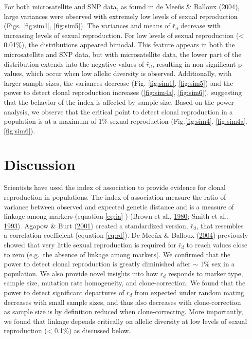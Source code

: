 \documentclass[double,11pt]{beavtex}
\begin{document}
  For both microsatellite and SNP data, as found in de Meeûs \& Balloux
  (\protect\hyperlink{ref-de2004clonal}{2004}), large variances were
  observed with extremely low levels of sexual reproduction (Figs.
  \ref{fig:sim1}, \ref{fig:sim5}). The variances and means of
  \(\bar{r}_d\) decrease with increasing levels of sexual reproduction.
  For low levels of sexual reproduction (\textless{} 0.01\%), the
  distributions appeared bimodal. This feature appears in both the
  microsatellite and SNP data, but with microsatellite data, the lower
  part of the distribution extends into the negative values of
  \(\bar{r}_d\), resulting in non-significant p-values, which occur when
  low allelic diversity is observed. Additionally, with larger sample
  sizes, the variances decrease (Fig. \ref{fig:sim1}, \ref{fig:sim5}) and
  the power to detect clonal reproduction increases (\ref{fig:sim4a},
  \ref{fig:sim6}), suggesting that the behavior of the index is affected
  by sample size. Based on the power analysis, we observe that the
  critical point to detect clonal reproduction in a population is at a
  maximum of 1\% sexual reproduction (Fig.\ref{fig:sim4}, \ref{fig:sim4a},
  \ref{fig:sim6}).
  
  \section{Discussion}\label{discussion-2}
  
  Scientists have used the index of association to provide evidence for
  clonal reproduction in populations. The index of association measure the
  ratio of variance between observed and expected genetic distance and is
  a measure of linkage among markers (equation \eqref{eq:ia} ) (Brown et
  al., \protect\hyperlink{ref-brown1980multilocus}{1980}; Smith et al.,
  \protect\hyperlink{ref-smith1993how}{1993}). Agapow \& Burt
  (\protect\hyperlink{ref-Agapow_2001}{2001}) created a standardized
  version, \(\bar{r}_d\), that resembles a correlation coefficient
  (equation \eqref{eq:rd}). De Meeûx \& Balloux
  (\protect\hyperlink{ref-de2004clonal}{2004}) previously showed that very
  little sexual reproduction is required for \(\bar{r}_d\) to reach values
  close to zero (e.g.~the absence of linkage among markers). We confirmed
  that the power to detect clonal reproduction is greatly diminished after
  \(\sim\) 1\% sex in a population. We also provide novel insights into
  how \(\bar{r}_d\) responds to marker type, sample size, mutation rate
  homogeneity, and clone-correction. We found that the power to detect
  significant departures of \(\bar{r}_d\) from expected under random
  mating decreases with small sample sizes, and thus also decreases with
  clone-correction as sample size is by definition reduced when
  clone-correcting. More importantly, we found that linkage depends
  critically on allelic diversity at low levels of sexual reproduction
  (\textless{} 0.1\%) as discussed below.
  
\end{document}
